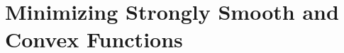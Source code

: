 \documentclass[openany]{book}
\theoremstyle{definition}
\theoremstyle{remark}
\newtheorem*{remark}{Remark}
\begin{document}
\section{Minimizing Strongly Smooth and Convex Functions}\label{sec:GDStrSmooth}
\end{document}

